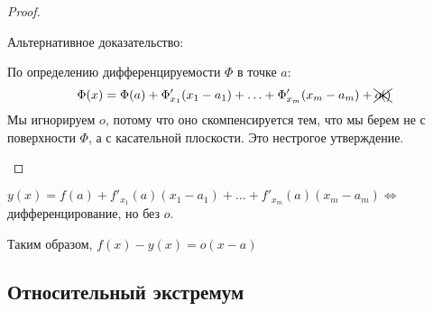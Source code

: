 \begin{proof}
\begin{enumerate}
              Альтернативное доказательство:

              По определению дифференцируемости $\Phi$ в точке $a$:
              $$\Phi(x) = \Phi(a) + \Phi'_{x_1}(x_1-a_1) + \ldots + \Phi'_{x_m}(x_m-a_m) + \xcancel{o()}$$
              Мы игнорируем $o$, потому что оно скомпенсируется тем, что мы берем не с поверхности $\Phi$, а с касательной плоскости. Это нестрогое утверждение.
    \end{enumerate}
\end{proof}

\begin{remark}
    $y(x) = f(a) + f'_{x_1}(a)(x_1-a_1)+\ldots + f'_{x_m}(a)(x_m-a_m)\Leftrightarrow$ дифференцирование, но без $o$.

    Таким образом, $f(x) - y(x) = o(x-a)$

\end{remark}

\subsection*{Относительный экстремум}

